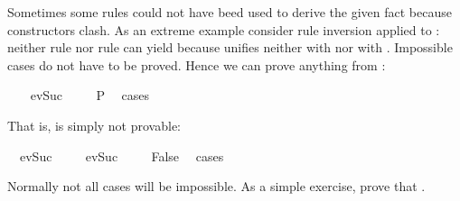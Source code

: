 \begin{isabellebody}
\begin{isamarkuptext}
Sometimes some rules could not have beed used to derive the given fact
because constructors clash. As an extreme example consider
rule inversion applied to : neither rule  nor
rule  can yield  because  unifies
neither with  nor with . Impossible cases do not
have to be proved. Hence we can prove anything from :%
\end{isamarkuptext}%
\isamarkuptrue%
%
\isadelimproof
%
\endisadelimproof
%
\isatagproof
\ \ \isamarkupfalse%
\ {}ev{}Suc\ {}{}{}\ \isamarkupfalse%
\ \isamarkupfalse%
\ P\ \isamarkupfalse%
\ cases%
\endisatagproof
{\isafoldproof}%
%
\isadelimproof
%
\endisadelimproof
%
\begin{isamarkuptext}%
That is,  is simply not provable:%
\end{isamarkuptext}%
\isamarkuptrue%
\isamarkupfalse%
\ {}{}\ ev{}Suc\ {}{}{}\isanewline
%
\isadelimproof
%
\endisadelimproof
%
\isatagproof
{}\isamarkupfalse%
\isanewline
\ \ \isamarkupfalse%
\ {}ev{}Suc\ {}{}{}\ \isamarkupfalse%
\ \isamarkupfalse%
\ False\ \isamarkupfalse%
\ cases\isanewline
{}\isamarkupfalse%
%
\endisatagproof
{\isafoldproof}%
%
\isadelimproof
%
\endisadelimproof
%
\begin{isamarkuptext}%
Normally not all cases will be impossible. As a simple exercise,
prove that \mbox{.}%
\end{isamarkuptext}%
\isamarkuptrue%
%
\isadelimtheory
%
\endisadelimtheory
%
\isatagtheory
%
\endisatagtheory
{\isafoldtheory}%
%
\isadelimtheory
%
\endisadelimtheory
\end{isabellebody}%
